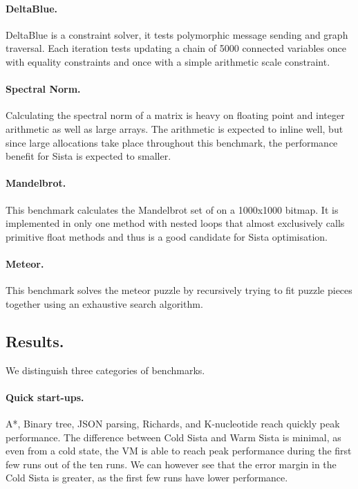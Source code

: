 \documentclass[a4paper,12pt,twoside]{../includes/ThesisStyle}
\begin{document}
	\paragraph{DeltaBlue.}DeltaBlue is a constraint solver, it tests polymorphic message sending and graph traversal. Each iteration tests updating a chain of 5000 connected variables once with equality constraints and once with a simple arithmetic scale constraint.

	\paragraph{Spectral Norm.}Calculating the spectral norm of a matrix is heavy on floating point and integer arithmetic as well as large arrays. The arithmetic is expected to inline well, but since large allocations take place throughout this benchmark, the performance benefit for Sista is expected to smaller.

	\paragraph{Mandelbrot.}This benchmark calculates the Mandelbrot set of on a 1000x1000 bitmap. It is implemented in only one method with nested loops that almost exclusively calls primitive float methods and thus is a good candidate for Sista optimisation.

	\paragraph{Meteor.}This benchmark solves the meteor puzzle by recursively trying to fit puzzle pieces together using an exhaustive search algorithm.

	\subsection*{Results.}We distinguish three categories of benchmarks.

	\paragraph{Quick start-ups.} A*, Binary tree, JSON parsing, Richards, and K-nucleotide reach quickly peak performance. The difference between Cold Sista and Warm Sista is minimal, as even from a cold state, the VM is able to reach peak performance during the first few runs out of the ten runs. We can however see that the error margin in the Cold Sista is greater, as the first few runs have lower performance.
\end{document}
